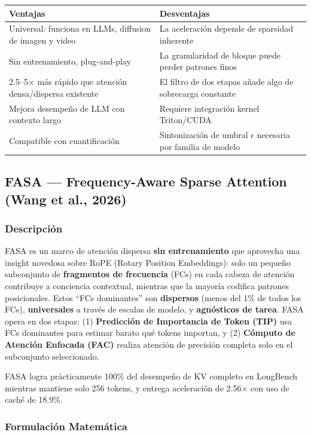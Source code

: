 \documentclass[11pt,a4paper]{article}
\begin{document}
\begin{tabular}{|p{4cm}|p{4cm}|}
\hline
\textbf{Ventajas} & \textbf{Desventajas} \\
\hline
Universal: funciona en LLMs, diffusion de imagen y video & La aceleración depende de sparsidad inherente \\
Sin entrenamiento, plug-and-play & La granularidad de bloque puede perder patrones finos \\
2.5–5× más rápido que atención densa/dispersa existente & El filtro de dos etapas añade algo de sobrecarga constante \\
Mejora desempeño de LLM con contexto largo & Requiere integración kernel Triton/CUDA \\
Compatible con cuantificación & Sintonización de umbral $\epsilon$ necesaria por familia de modelo \\
\hline
\end{tabular}

\subsection{FASA — Frequency-Aware Sparse Attention (Wang et al., 2026)}

\subsubsection{Descripción}

FASA es un marco de atención dispersa \textbf{sin entrenamiento} que aprovecha una insight novedosa sobre RoPE (Rotary Position Embeddings): solo un pequeño subconjunto de \textbf{fragmentos de frecuencia} (FCs) en cada cabeza de atención contribuye a conciencia contextual, mientras que la mayoría codifica patrones posicionales. Estos ``FCs dominantes'' son \textbf{dispersos} (menos del 1\% de todos los FCs), \textbf{universales} a través de escalas de modelo, y \textbf{agnósticos de tarea}. FASA opera en dos etapas: (1) \textbf{Predicción de Importancia de Token (TIP)} usa FCs dominantes para estimar barato qué tokens importan, y (2) \textbf{Cómputo de Atención Enfocada (FAC)} realiza atención de precisión completa solo en el subconjunto seleccionado.

FASA logra prácticamente 100\% del desempeño de KV completo en LongBench mientras mantiene solo 256 tokens, y entrega aceleración de 2.56× con uso de caché de 18.9\%.

\subsubsection{Formulación Matemática}
\end{document}
